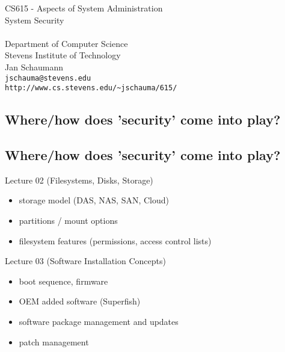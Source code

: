 \documentclass[xga]{xdvislides}
\begin{document}
\setfontphv

\lhead{\slidetitle}                               %
\cfoot{\relax}                               %
\rfoot{\Gray{\today}}
\vspace*{\fill}
\begin{center}
	\Hugesize
		CS615 - Aspects of System Administration\\ [1em]
		System Security\\ [1em]
	\hspace*{5mm}\blueline\\ [1em]
	\Normalsize
		Department of Computer Science\\
		Stevens Institute of Technology\\
		Jan Schaumann\\
		\verb+jschauma@stevens.edu+ \\
		\verb+http://www.cs.stevens.edu/~jschauma/615/+
\end{center}
\vspace*{\fill}

\subsection{Where/how does 'security' come into play?}

\subsection{Where/how does 'security' come into play?}
Lecture 02 (Filesystems, Disks, Storage)
\begin{itemize}
	\item storage model (DAS, NAS, SAN, Cloud)
	\item partitions / mount options
	\item filesystem features (permissions, access control lists)
\end{itemize}
\vspace{.5in}
Lecture 03 (Software Installation Concepts)
\begin{itemize}
	\item boot sequence, firmware
	\item OEM added software (Superfish)
	\item software package management and updates
	\item patch management
\end{itemize}
\end{document}
